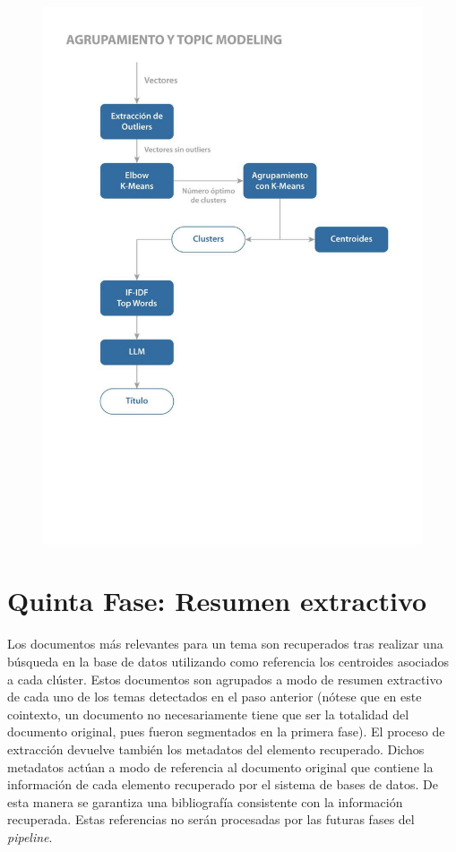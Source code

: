     \begin{figure}[H]    
        \centering
        \includegraphics[scale = 1]{Figures/pipeline_3.jpg}
        \caption*{}
    \end{figure}

    \section{Quinta Fase: Resumen extractivo} 
    Los documentos más relevantes para un tema son recuperados tras realizar una búsqueda en la base de datos utilizando como referencia los centroides asociados a cada clúster. Estos documentos son agrupados a modo de resumen extractivo de cada uno de los temas detectados en el paso anterior (nótese que en este cointexto, un documento no necesariamente tiene que ser la totalidad del documento original, pues fueron segmentados en la primera fase). El proceso de extracción devuelve también los metadatos del elemento recuperado. Dichos metadatos actúan a modo de referencia al documento original que contiene la información de cada elemento recuperado por el sistema de bases de datos. De esta manera se garantiza una bibliografía consistente con la información recuperada. Estas referencias no serán procesadas por las futuras fases del \emph{pipeline}.
    

